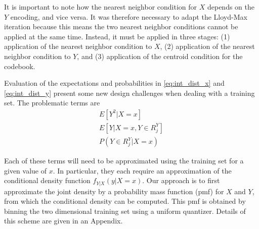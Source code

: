 \documentclass[10pt,twoside,titlepage]{article}
\begin{document}
It is important to note how the nearest neighbor condition for $X$ depends on the $Y$ encoding, and vice versa. It was therefore necessary to adapt the Lloyd-Max iteration because this means the two nearest neighbor conditions cannot be applied at the same time. Instead, it must be applied in three stages: (1) application of the nearest neighbor condition to $X$, (2) application of the nearest neighbor condition to $Y$, and (3) application of the centroid condition for the codebook.

Evaluation  of the expectations and probabilities in \eqref{eq:int_dist_x} and \eqref{eq:int_dist_y} present some new design challenges when dealing with a training set. The problematic terms are
\begin{align}
    \label{eq:problem_1}
    E[Y^2 | X = x]\\
    \label{eq:problem_2}
    E[Y|X=x,Y\in R_j^Y]\\
    \label{eq:problem_3}
    P(Y\in R_j^Y|X=x)
\end{align}

Each of these terms will need to be approximated using the training set for a given value of $x$. In particular, they each require an approximation of the conditional density function $f_{Y|X}(y|X=x)$. Our approach is to first approximate the joint density by a probability mass function (pmf) for $X$ and $Y$, from which the conditional density can be computed. This pmf is obtained by binning the two dimensional training set using a uniform quantizer. Details of this scheme are given in an Appendix.
 
\end{document}
